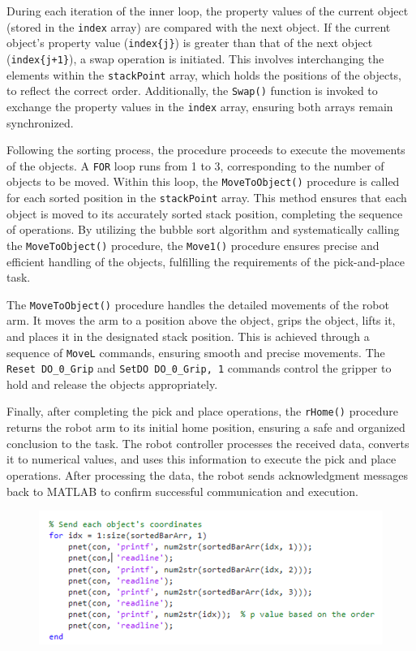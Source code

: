 During each iteration of the inner loop, the property values of the current object (stored in the \texttt{index} array) are compared with the next object. If the current object's property value (\texttt{index\{j\}}) is greater than that of the next object (\texttt{index\{j+1\}}), a swap operation is initiated. This involves interchanging the elements within the \texttt{stackPoint} array, which holds the positions of the objects, to reflect the correct order. Additionally, the \texttt{Swap()} function is invoked to exchange the property values in the \texttt{index} array, ensuring both arrays remain synchronized.

Following the sorting process, the procedure proceeds to execute the movements of the objects. A \texttt{FOR} loop runs from 1 to 3, corresponding to the number of objects to be moved. Within this loop, the \texttt{MoveToObject()} procedure is called for each sorted position in the \texttt{stackPoint} array. This method ensures that each object is moved to its accurately sorted stack position, completing the sequence of operations. By utilizing the bubble sort algorithm and systematically calling the \texttt{MoveToObject()} procedure, the \texttt{Move1()} procedure ensures precise and efficient handling of the objects, fulfilling the requirements of the pick-and-place task.

The \texttt{MoveToObject()} procedure handles the detailed movements of the robot arm. It moves the arm to a position above the object, grips the object, lifts it, and places it in the designated stack position. This is achieved through a sequence of \texttt{MoveL} commands, ensuring smooth and precise movements. The \texttt{Reset DO\_0\_Grip} and \texttt{SetDO DO\_0\_Grip, 1} commands control the gripper to hold and release the objects appropriately.

Finally, after completing the pick and place operations, the \texttt{rHome()} procedure returns the robot arm to its initial home position, ensuring a safe and organized conclusion to the task. The robot controller processes the received data, converts it to numerical values, and uses this information to execute the pick and place operations. After processing the data, the robot sends acknowledgment messages back to MATLAB to confirm successful communication and execution.

\begin{figure}[H]
    \includegraphics[width=4.5in ]{pics/MVOE.png}
    \label{PIC}
\end{figure}

